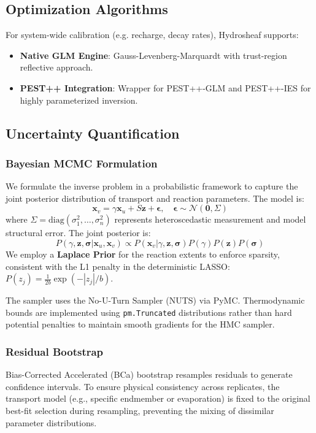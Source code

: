 \documentclass[12pt,a4paper]{article}
\theoremstyle{plain}
\theoremstyle{definition}
\theoremstyle{remark}
\begin{document}
\subsection{Optimization Algorithms}\label{sec:optimization_algorithms}
For system-wide calibration (e.g. recharge, decay rates), Hydrosheaf supports:
\begin{itemize}
	\item \textbf{Native GLM Engine}: Gauss-Levenberg-Marquardt with trust-region reflective approach.
	\item \textbf{PEST++ Integration}: Wrapper for PEST++-GLM and PEST++-IES for highly parameterized inversion.
\end{itemize}

\subsection{Uncertainty Quantification}\label{sec:uncertainty}
\subsubsection{Bayesian MCMC Formulation}
We formulate the inverse problem in a probabilistic framework to capture the joint posterior distribution of transport and reaction parameters. The model is:
\begin{equation}
	\mathbf{x}_v = \gamma \mathbf{x}_u + S \mathbf{z} + \boldsymbol{\epsilon}, \quad \boldsymbol{\epsilon} \sim \mathcal{N}(\mathbf{0}, \Sigma)
\end{equation}
where $\Sigma = \text{diag}(\sigma_1^2, \dots, \sigma_n^2)$ represents heteroscedastic measurement and model structural error. The joint posterior is:
\begin{equation}
	P(\gamma, \mathbf{z}, \boldsymbol{\sigma} | \mathbf{x}_u, \mathbf{x}_v) \propto P(\mathbf{x}_v | \gamma, \mathbf{z}, \boldsymbol{\sigma}) P(\gamma) P(\mathbf{z}) P(\boldsymbol{\sigma})
\end{equation}
We employ a \textbf{Laplace Prior} for the reaction extents to enforce sparsity, consistent with the L1 penalty in the deterministic LASSO: $P(z_j) = \frac{1}{2b} \exp(-|z_j|/b)$.

The sampler uses the No-U-Turn Sampler (NUTS) via PyMC. Thermodynamic bounds are implemented using \texttt{pm.Truncated} distributions rather than hard potential penalties to maintain smooth gradients for the HMC sampler.

\subsubsection{Residual Bootstrap}
Bias-Corrected Accelerated (BCa) bootstrap resamples residuals to generate confidence intervals. To ensure physical consistency across replicates, the transport model (e.g., specific endmember or evaporation) is fixed to the original best-fit selection during resampling, preventing the mixing of dissimilar parameter distributions.
\end{document}
